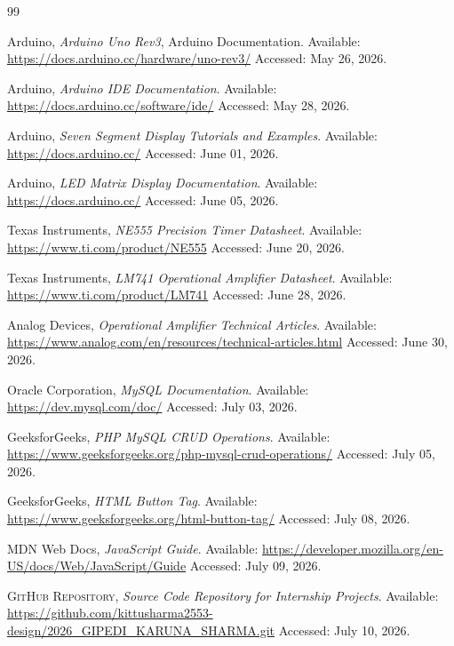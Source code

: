 \documentclass[12pt,a4paper]{report}
\begin{document}
\begin{thebibliography}{99}

Arduino,
\textit{Arduino Uno Rev3},
Arduino Documentation.
Available:
\url{https://docs.arduino.cc/hardware/uno-rev3/}
Accessed: May 26, 2026.

Arduino,
\textit{Arduino IDE Documentation}.
Available:
\url{https://docs.arduino.cc/software/ide/}
Accessed: May 28, 2026.

Arduino,
\textit{Seven Segment Display Tutorials and Examples}.
Available:
\url{https://docs.arduino.cc/}
Accessed: June 01, 2026.

Arduino,
\textit{LED Matrix Display Documentation}.
Available:
\url{https://docs.arduino.cc/}
Accessed: June 05, 2026.

Texas Instruments,
\textit{NE555 Precision Timer Datasheet}.
Available:
\url{https://www.ti.com/product/NE555}
Accessed: June 20, 2026.

Texas Instruments,
\textit{LM741 Operational Amplifier Datasheet}.
Available:
\url{https://www.ti.com/product/LM741}
Accessed: June 28, 2026.

Analog Devices,
\textit{Operational Amplifier Technical Articles}.
Available:
\url{https://www.analog.com/en/resources/technical-articles.html}
Accessed: June 30, 2026.

Oracle Corporation,
\textit{MySQL Documentation}.
Available:
\url{https://dev.mysql.com/doc/}
Accessed: July 03, 2026.

GeeksforGeeks,
\textit{PHP MySQL CRUD Operations}.
Available:
\url{https://www.geeksforgeeks.org/php-mysql-crud-operations/}
Accessed: July 05, 2026.

GeeksforGeeks,
\textit{HTML Button Tag}.
Available:
\url{https://www.geeksforgeeks.org/html-button-tag/}
Accessed: July 08, 2026.

MDN Web Docs,
\textit{JavaScript Guide}.
Available:
\url{https://developer.mozilla.org/en-US/docs/Web/JavaScript/Guide}
Accessed: July 09, 2026.

\textsc{GitHub Repository,}
\textit{Source Code Repository for Internship Projects}.
Available:
\url{https://github.com/kittusharma2553-design/2026_GIPEDI_KARUNA_SHARMA.git}
Accessed: July 10, 2026.

\end{thebibliography}
\end{document}
